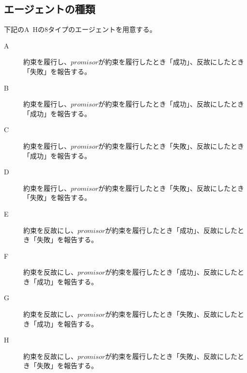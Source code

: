 \subsection{エージェントの種類}
下記のA~Hの8タイプのエージェントを用意する。
\begin{description}
  \item [A] 約束を履行し、$promisor$が約束を履行したとき「成功」、反故にしたとき「失敗」を報告する。
  \item [B] 約束を履行し、$promisor$が約束を履行したとき「成功」、反故にしたとき「成功」を報告する。
  \item [C] 約束を履行し、$promisor$が約束を履行したとき「失敗」、反故にしたとき「成功」を報告する。
  \item [D] 約束を履行し、$promisor$が約束を履行したとき「失敗」、反故にしたとき「失敗」を報告する。
  \item [E] 約束を反故にし、$promisor$が約束を履行したとき「成功」、反故にしたとき「失敗」を報告する。
  \item [F] 約束を反故にし、$promisor$が約束を履行したとき「成功」、反故にしたとき「成功」を報告する。
  \item [G] 約束を反故にし、$promisor$が約束を履行したとき「失敗」、反故にしたとき「成功」を報告する。
  \item [H] 約束を反故にし、$promisor$が約束を履行したとき「失敗」、反故にしたとき「失敗」を報告する。
\end{description}

